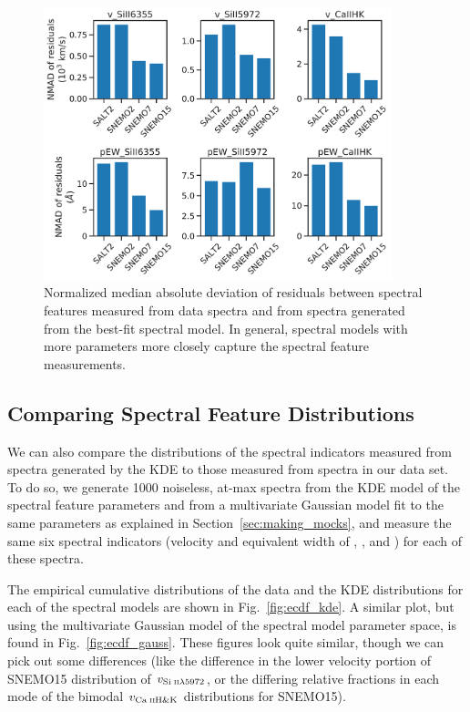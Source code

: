 \begin{figure}
    \centering
    \includegraphics[width=0.9\textwidth]{figures/snemo_kde/model_spec_feat_recovery.pdf}
    \caption{Normalized median absolute deviation of residuals between spectral features measured from data spectra and from spectra generated from the best-fit spectral model. In general, spectral models with more parameters more closely capture the spectral feature measurements.}
    \label{fig:model_spec_feat_recovery}
\end{figure}

\subsection{Comparing Spectral Feature Distributions}
We can also compare the distributions of the spectral indicators measured from spectra generated by the KDE to those measured from spectra in our data set. To do so, we generate 1000 noiseless, at-max spectra from the KDE model of the spectral feature parameters and from a multivariate Gaussian model fit to the same parameters as explained in Section~\ref{sec:making_mocks}, and measure the same six spectral indicators (velocity and equivalent width of \SiIIred, \SiIIblue, and \CaIIHK{}) for each of these spectra.

The empirical cumulative distributions of the data and the KDE distributions for each of the spectral models are shown in Fig.~\ref{fig:ecdf_kde}. A similar plot, but using the multivariate Gaussian model of the spectral model parameter space, is found in Fig.~\ref{fig:ecdf_gauss}. These figures look quite similar, though we can pick out some differences (like the difference in the lower velocity portion of SNEMO15 distribution of $v_\text{Si$\;${\scshape{ii}}$\lambda$5972}$, or the differing relative fractions in each mode of the bimodal $v_\text{Ca$\;${\scshape{ii}}H\&K{}}$ distributions for SNEMO15).

